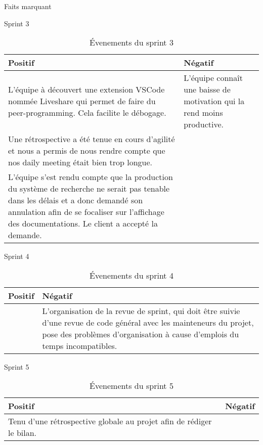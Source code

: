 \documentclass[]{article}
\begin{document}
{\begin{section}{Faits marquant}
    \begin{subsection}{Sprint 3}
        \begin{table}[H]
            \caption{Évenements du sprint 3}
            \begin{tabularx}{\columnwidth}{|X|X|}
                \hline
                \cellcolor[HTML]{17FF00}Positif & \cellcolor[HTML]{FF2D00}Négatif\\
                \hline
                L'équipe à découvert une extension VSCode nommée Liveshare qui permet de faire du peer-programming. Cela facilite le débogage. & L'équipe connaît une baisse de motivation qui la rend moins productive. \\
                \hline
                Une rétrospective a été tenue en cours d'agilité et nous a permis de nous rendre compte que nos daily meeting était bien trop longue. & \\
                \hline
                L'équipe s'est rendu compte que la production du système de recherche ne serait pas tenable dans les délais et a donc demandé son annulation afin de se focaliser sur l'affichage des documentations. Le client a accepté la demande. & \\
                \hline
            \end{tabularx}
        \end{table}
    \end{subsection}

    \begin{subsection}{Sprint 4}
        \begin{table}[H]
            \caption{Évenements du sprint 4}
            \begin{tabularx}{\columnwidth}{|X|X|}
                \hline
                \cellcolor[HTML]{17FF00}Positif & \cellcolor[HTML]{FF2D00}Négatif\\
                \hline
                 & L'organisation de la revue de sprint, qui doit être suivie d'une revue de code général avec les mainteneurs du projet, pose des problèmes d'organisation à cause d'emplois du temps incompatibles. \\
                \hline
            \end{tabularx}
        \end{table}
    \end{subsection}

    \begin{subsection}{Sprint 5}
        \begin{table}[H]
            \caption{Évenements du sprint 5}
            \begin{tabularx}{\columnwidth}{|X|X|}
                \hline
                \cellcolor[HTML]{17FF00}Positif & \cellcolor[HTML]{FF2D00}Négatif\\
                \hline
                Tenu d'une rétrospective globale au projet afin de rédiger le bilan. & \\
                \hline
            \end{tabularx}
        \end{table}
    \end{subsection}


\end{section}}
\end{document}
